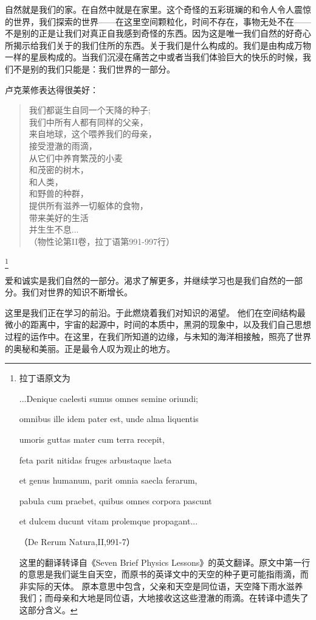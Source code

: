     自然就是我们的家。在自然中就是在家里。这个奇怪的五彩斑斓的和令人令人震惊的世界，我们探索的世界——在这里空间颗粒化，时间不存在，事物无处不在——不是别的正是让我们对真正自我感到奇怪的东西。因为这是唯一我们自然的好奇心所揭示给我们关于的我们住所的东西。关于我们是什么构成的。我们是由构成万物一样的星辰构成的。当我们沉浸在痛苦之中或者当我们体验巨大的快乐的时候，我们不是别的我们只能是：我们世界的一部分。
 
   卢克莱修表达得很美好：
\begin{verse} 

我们都诞生自同一个天降的种子;\\
我们中所有人都有同样的父亲，\\
来自地球，这个喂养我们的母亲，\\
接受澄澈的雨滴，\\
从它们中养育繁茂的小麦\\
和茂密的树木，\\
和人类，\\
和野兽的种群，\\
提供所有滋养一切躯体的食物，\\
带来美好的生活\\
并生生不息...\\
（物性论第II卷，拉丁语第991-997行）
 
\end{verse} 
\footnote[3]
{
拉丁语原文为

...Denique caelesti sumus omnes semine oriundi;

omnibus ille idem pater est, unde alma liquentis

umoris guttas mater cum terra recepit,

feta parit nitidas fruges arbustaque laeta

et genus humanum, parit omnia saecla ferarum,

pabula cum praebet, quibus omnes corpora pascunt

et dulcem ducunt vitam prolemque propagant...

（De Rerum Natura,II,991-7）

这里的翻译转译自《Seven Brief Physics Lessons》的英文翻译。原文中第一行的意思是我们诞生自天空，而原书的英译文中的天空的种子更可能指雨滴，而非实际的天体。
原本意思中包含，父亲和天空是同位语，天空降下雨水滋养我们；而母亲和大地是同位语，大地接收这这些澄澈的雨滴。在转译中遗失了这部分含义。
}

    爱和诚实是我们自然的一部分。渴求了解更多，并继续学习也是我们自然的一部分。我们对世界的知识不断增长。
 
   这里是我们正在学习的前沿。于此燃烧着我们对知识的渴望。 他们在空间结构最微小的距离中，宇宙的起源中，时间的本质中，黑洞的现象中，以及我们自己思想过程的运作中。在这里，在我们所知道的边缘，与未知的海洋相接触，照亮了世界的奥秘和美丽。正是最令人叹为观止的地方。




\noindent
